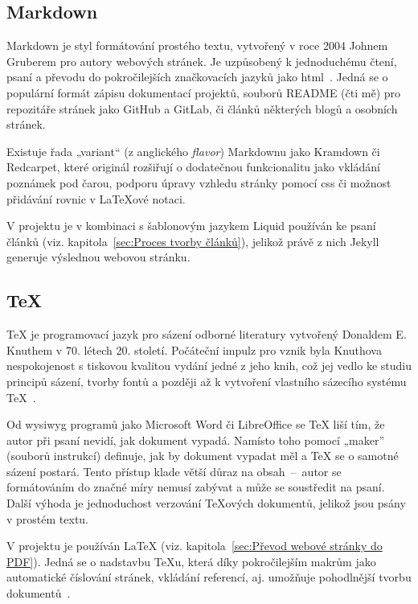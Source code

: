 \documentclass[a4paper, 12pt]{article}
\begin{document}
  \subsection{Markdown} \label{sec:Markdown}
  Markdown je styl formátování prostého textu, vytvořený v roce 2004 Johnem Gruberem pro autory webových stránek. Je uzpůsobený k jednoduchému čtení, psaní a převodu do pokročilejších značkovacích jazyků jako \gls{html}~\cite{markdown-history}. Jedná se o populární formát zápisu dokumentací projektů, souborů README (čti mě) pro repozitáře stránek jako GitHub a GitLab, či článků některých blogů a osobních stránek.

  Existuje řada „variant“ (z anglického \textit{flavor}) Markdownu jako Kramdown či Redcarpet, které originál rozšiřují o dodatečnou funkcionalitu jako vkládání poznámek pod čarou, podporu úpravy vzhledu stránky pomocí \gls{css} či možnost přidávání rovnic v \LaTeX ové notaci.

  V projektu je v kombinaci s šablonovým jazykem Liquid používán ke psaní článků (viz. kapitola~\ref{sec:Proces tvorby článků}), jelikož právě z nich Jekyll generuje výslednou webovou stránku.


  \subsection{\TeX} \label{sec:TeX}
  \TeX{} je programovací jazyk pro sázení odborné literatury vytvořený Donaldem E. Knuthem v 70. létech 20. století. Počáteční impulz pro vznik byla Knuthova nespokojenost s tiskovou kvalitou vydání jedné z jeho knih, což jej vedlo ke studiu principů sázení, tvorby fontů a později až k vytvoření vlastního sázecího systému \TeX{}~\cite{tex-history}.

  Od \gls{wysiwyg} programů jako Microsoft Word či LibreOffice se \TeX{} liší tím, že autor při psaní nevidí, jak dokument vypadá. Namísto toho pomocí „maker” (souborů instrukcí) definuje, jak by dokument vypadat měl a \TeX{} se o samotné sázení postará. Tento přístup klade větší důraz na obsah~--~autor se formátováním do značné míry nemusí zabývat a může se soustředit na psaní. Další výhoda je jednoduchost verzování \TeX ových dokumentů, jelikož jsou psány v prostém textu.

  V projektu je používán \LaTeX{} (viz. kapitola~\ref{sec:Převod webové stránky do PDF}). Jedná se o nadstavbu \TeX u, která díky pokročilejším makrům jako automatické číslování stránek, vkládání referencí, aj. umožňuje pohodlnější tvorbu dokumentů~\cite{getting-started-with-latex}.
\end{document}
